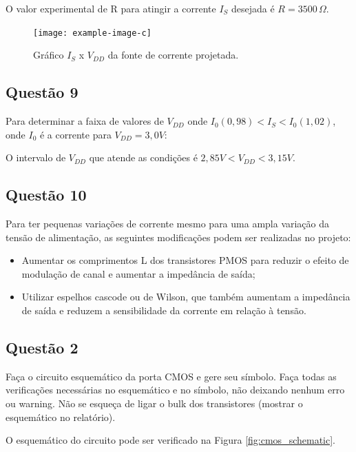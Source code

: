 \documentclass[12pt,a4paper]{article}
\begin{document}
O valor experimental de R para atingir a corrente $I_S$ desejada é $R = 3500 \, \Omega$.

\begin{figure}[H]
    \centering
    \texttt{[image: example-image-c]}
    \caption{Gráfico $I_S$ x $V_{DD}$ da fonte de corrente projetada.}
    \label{fig:is_vdd}
\end{figure}

\subsection*{Questão 9}

Para determinar a faixa de valores de $V_{DD}$ onde $I_0(0,98) < I_S < I_0(1,02)$, onde $I_0$ é a corrente para $V_{DD} = 3,0V$:

O intervalo de $V_{DD}$ que atende as condições é $2,85V < V_{DD} < 3,15V$.

\subsection*{Questão 10}

Para ter pequenas variações de corrente mesmo para uma ampla variação da tensão de alimentação, as seguintes modificações podem ser realizadas no projeto:

\begin{itemize}
    \item Aumentar os comprimentos L dos transistores PMOS para reduzir o efeito de modulação de canal e aumentar a impedância de saída;
    \item Utilizar espelhos cascode ou de Wilson, que também aumentam a impedância de saída e reduzem a sensibilidade da corrente em relação à tensão.
\end{itemize}

\subsection*{Questão 2}

Faça o circuito esquemático da porta CMOS e gere seu símbolo. Faça todas as verificações necessárias no esquemático e no símbolo, não deixando nenhum erro ou warning. Não se esqueça de ligar o bulk dos transistores (mostrar o esquemático no relatório).

O esquemático do circuito pode ser verificado na Figura \ref{fig:cmos_schematic}.
\end{document}

